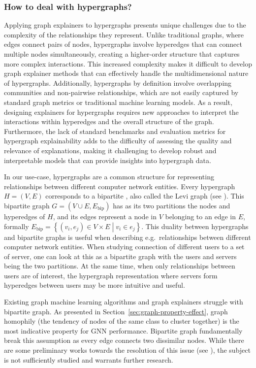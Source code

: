 \subsubsection{How to deal with hypergraphs?}

Applying graph explainers to hypergraphs presents unique challenges due to the complexity of the relationships they represent. Unlike traditional graphs, where edges connect pairs of nodes, hypergraphs involve hyperedges that can connect multiple nodes simultaneously, creating a higher-order structure that captures more complex interactions. This increased complexity makes it difficult to develop graph explainer methods that can effectively handle the multidimensional nature of hypergraphs. Additionally, hypergraphs by definition involve overlapping communities and non-pairwise relationships, which are not easily captured by standard graph metrics or traditional machine learning models. As a result, designing explainers for hypergraphs requires new approaches to interpret the interactions within hyperedges and the overall structure of the graph. Furthermore, the lack of standard benchmarks and evaluation metrics for hypergraph explainability adds to the difficulty of assessing the quality and relevance of explanations, making it challenging to develop robust and interpretable models that can provide insights into hypergraph data.

In our use-case, hypergraphs are a common structure for representing relationships between different computer network entities. Every hypergraph \( H = \left( V, E \right) \) corresponds to a bipartite , also called the Levi graph (see \cite{levi_finite_1942}). This bipartite graph \( G= \left( V \cup E, E_\mathrm{bip} \right) \) has as its two partitions the nodes and hyperedges of \( H \), and its edges represent a node in \( V \) belonging to an edge in \( E \), formally \( E_\mathrm{bip} = \left\{ \left( v_i, e_j \right) \in V \times E \middle| v_i \in e_j \right\} \). This duality between hypergraphs and bipartite graphs is useful when describing e.g.\ relationships between different computer network entities. When studying connection of different users to a set of server, one can look at this as a bipartite graph with the users and servers being the two partitions. At the same time, when only relationships between users are of interest, the hypergraph representation where servers form hyperedges between users may be more intuitive and useful.

Existing graph machine learning algorithms and graph explainers struggle with bipartite graph. As presented in Section~\ref{sec:graph-property-effect}, graph homophily (the tendency of nodes of the same class to cluster together) is the most indicative property for GNN performance. Bipartite graph fundamentally break this assumption as every edge connects two dissimilar nodes. While there are some preliminary works towards the resolution of this issue (see \cite{maleki_learning_2023}), the subject is not sufficiently studied and warrants further research.

